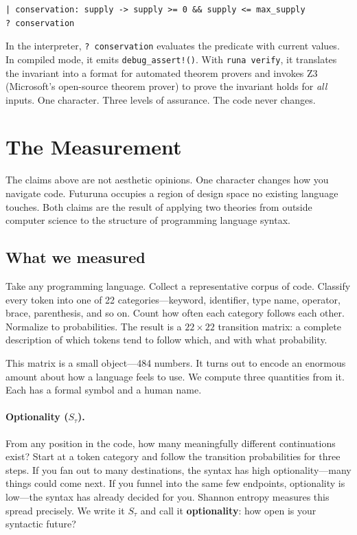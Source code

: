 \documentclass[11pt,a4paper]{article}
\newcommand{\Stau}{S_\tau}
\begin{document}
\begin{lstlisting}
| conservation: supply -> supply >= 0 && supply <= max_supply
? conservation
\end{lstlisting}

In the interpreter, \texttt{?~conservation} evaluates the predicate with current values. In compiled mode, it emits \texttt{debug\_assert!()}. With \texttt{runa verify}, it translates the invariant into a format for automated theorem provers and invokes Z3 \cite{DeMoura2008} (Microsoft's open-source theorem prover) to prove the invariant holds for \emph{all} inputs. One character. Three levels of assurance. The code never changes.

\section{The Measurement}

The claims above are not aesthetic opinions. One character changes how you navigate code. Futuruna occupies a region of design space no existing language touches. Both claims are the result of applying two theories from outside computer science to the structure of programming language syntax.

\subsection{What we measured}

Take any programming language. Collect a representative corpus of code. Classify every token into one of 22 categories---keyword, identifier, type name, operator, brace, parenthesis, and so on. Count how often each category follows each other. Normalize to probabilities. The result is a $22 \times 22$ transition matrix: a complete description of which tokens tend to follow which, and with what probability.

This matrix is a small object---484 numbers. It turns out to encode an enormous amount about how a language feels to use. We compute three quantities from it. Each has a formal symbol and a human name.

\paragraph{Optionality ($\Stau$).} From any position in the code, how many meaningfully different continuations exist? Start at a token category and follow the transition probabilities for three steps. If you fan out to many destinations, the syntax has high optionality---many things could come next. If you funnel into the same few endpoints, optionality is low---the syntax has already decided for you. Shannon entropy \cite{Shannon1948} measures this spread precisely. We write it $\Stau$ and call it \textbf{optionality}: how open is your syntactic future?
\end{document}
